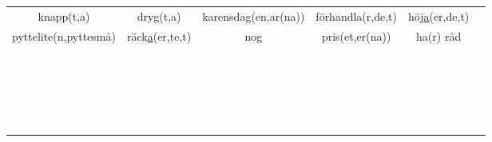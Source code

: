 \begin{center}
\begin{adjustwidth}{-2.5cm}{}
\begin{tabular}{|c c c c c c|}
            knapp(t,a) & dryg(t,a) & karensdag(en,ar(na)) & förhandla(r,de,t) & höj\underline{a}(er,de,t) &  \\
            pyttelite(n,pyttesmå) & räck\underline{a}(er,te,t) & nog & pris(et,er(na)) & ha(r) råd &  \\
             &  &  &  &  &  \\
             &  &  &  &  &  \\
             &  &  &  &  &  \\
             &  &  &  &  &  \\
             &  &  &  &  &  \\
             &  &  &  &  &  \\
             &  &  &  &  &  \\
             &  &  &  &  &  \\
             &  &  &  &  &  \\
             &  &  &  &  &  \\
             &  &  &  &  &  \\
             &  &  &  &  &  \\
             &  &  &  &  &  \\
             &  &  &  &  &  \\
             &  &  &  &  &  \\
             &  &  &  &  &  \\
             &  &  &  &  &  \\
             &  &  &  &  &  \\
             &  &  &  &  &  \\
             &  &  &  &  &  \\
             &  &  &  &  &  \\
            \hline
        \end{tabular}
    \end{adjustwidth}
\end{center}

